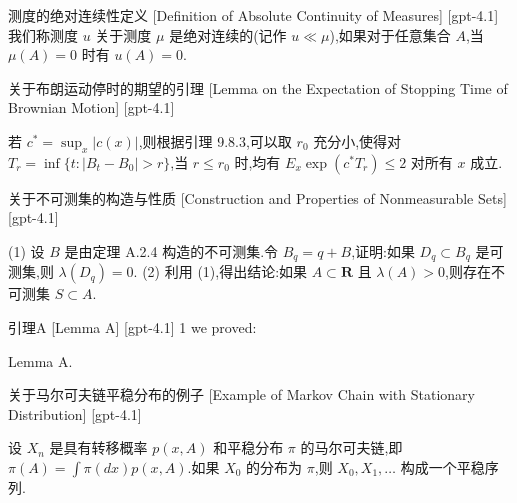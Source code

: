 \documentclass[UTF8]{ctexart}
\begin{document}
    
    
    \begin{dfn}
        {测度的绝对连续性定义}
        [Definition of Absolute Continuity of Measures]
        [gpt-4.1]
        我们称测度 $
u$ 关于测度 $\mu$ 是绝对连续的(记作 $
u \ll \mu$),如果对于任意集合 $A$,当 $\mu(A) = 0$ 时有 $
u(A) = 0$.
    \end{dfn}
    
    
    
    \begin{lma}
        {关于布朗运动停时的期望的引理}
        [Lemma on the Expectation of Stopping Time of Brownian Motion]
        [gpt-4.1]
        
若 $c^* = \sup_{x} |c(x)|$,则根据引理 9.8.3,可以取 $r_0$ 充分小,使得对 $T_r = \inf\{ t : |B_t - B_0| > r \}$,当 $r \leq r_0$ 时,均有 $E_x \exp( c^* T_r ) \leq 2$ 对所有 $x$ 成立.

    \end{lma}
    
    
    
    \begin{thm}
        {关于不可测集的构造与性质}
        [Construction and Properties of Nonmeasurable Sets]
        [gpt-4.1]
        
(1) 设 $B$ 是由定理 A.2.4 构造的不可测集.令 $B_q = q + B$,证明:如果 $D_q \subset B_q$ 是可测集,则 $\lambda(D_q) = 0$.
(2) 利用 (1),得出结论:如果 $A \subset \mathbf{R}$ 且 $\lambda(A) > 0$,则存在不可测集 $S \subset A$.

    \end{thm}
    
    
    
    \begin{lma}
        [Lemma-A]
        {引理A}
        [Lemma A]
        [gpt-4.1]
        1 we proved:

Lemma A.
    \end{lma}
    
    
    
    \begin{xmp}
        {关于马尔可夫链平稳分布的例子}
        [Example of Markov Chain with Stationary Distribution]
        [gpt-4.1]
        
设 $X_{n}$ 是具有转移概率 $p(x, A)$ 和平稳分布 $\pi$ 的马尔可夫链,即 $\pi(A) = \int \pi(dx) p(x, A)$.如果 $X_{0}$ 的分布为 $\pi$,则 $X_{0}, X_{1}, \ldots$ 构成一个平稳序列.

    \end{xmp}
    
\end{document}
